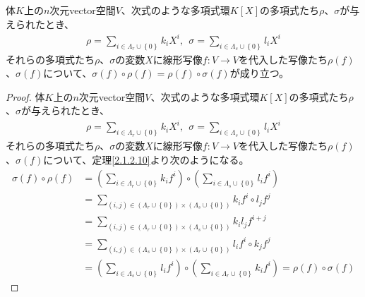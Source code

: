 \documentclass[dvipdfmx]{jsarticle}
\begin{document}
\begin{thm}\label{2.2.3.5}
体$K$上の$n$次元vector空間$V$、次式のような多項式環$K[ X]$の多項式たち$\rho$、$\sigma$が与えられたとき、
\begin{align*}
\rho = \sum_{i \in \varLambda_{r} \cup \left\{ 0 \right\}} {k_{i}X^{i}},\ \ \sigma = \sum_{i \in \varLambda_{s} \cup \left\{ 0 \right\}} {l_{i}X^{i}}
\end{align*}
それらの多項式たち$\rho$、$\sigma$の変数$X$に線形写像$f:V \rightarrow V$を代入した写像たち$\rho(f)$、$\sigma(f)$について、$\sigma(f) \circ \rho(f) = \rho(f) \circ \sigma(f)$が成り立つ。
\end{thm}
\begin{proof}
体$K$上の$n$次元vector空間$V$、次式のような多項式環$K[ X]$の多項式たち$\rho$、$\sigma$が与えられたとき、
\begin{align*}
\rho = \sum_{i \in \varLambda_{r} \cup \left\{ 0 \right\}} {k_{i}X^{i}},\ \ \sigma = \sum_{i \in \varLambda_{s} \cup \left\{ 0 \right\}} {l_{i}X^{i}}
\end{align*}
それらの多項式たち$\rho$、$\sigma$の変数$X$に線形写像$f:V \rightarrow V$を代入した写像たち$\rho(f)$、$\sigma(f)$について、定理\ref{2.1.2.10}より次のようになる。
\begin{align*}
\sigma(f) \circ \rho(f) &= \left( \sum_{i \in \varLambda_{r} \cup \left\{ 0 \right\}} {k_{i}f^{i}} \right) \circ \left( \sum_{i \in \varLambda_{s} \cup \left\{ 0 \right\}} {l_{i}f^{i}} \right)\\
&= \sum_{(i,j) \in \left( \varLambda_{r} \cup \left\{ 0 \right\} \right) \times \left( \varLambda_{s} \cup \left\{ 0 \right\} \right)} {k_{i}f^{i} \circ l_{j}f^{j}}\\
&= \sum_{(i,j) \in \left( \varLambda_{r} \cup \left\{ 0 \right\} \right) \times \left( \varLambda_{s} \cup \left\{ 0 \right\} \right)} {k_{i}l_{j}f^{i + j}}\\
&= \sum_{(i,j) \in \left( \varLambda_{s} \cup \left\{ 0 \right\} \right) \times \left( \varLambda_{r} \cup \left\{ 0 \right\} \right)} {l_{i}f^{i} \circ k_{j}f^{j}}\\
&= \left( \sum_{i \in \varLambda_{s} \cup \left\{ 0 \right\}} {l_{i}f^{i}} \right) \circ \left( \sum_{i \in \varLambda_{r} \cup \left\{ 0 \right\}} {k_{i}f^{i}} \right) = \rho(f) \circ \sigma(f)
\end{align*}
\end{proof}
\end{document}
